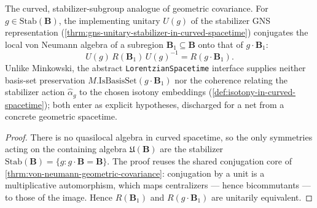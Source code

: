\begin{theorem}
    \label{thrm:von-neumann-geometric-covariance-in-curved-spacetime}
    \leanok
    The curved, stabilizer-subgroup analogue of geometric covariance. For $g \in \mathrm{Stab}(\mathbf{B})$, the implementing unitary $U(g)$ of the stabilizer GNS representation (\ref{thrm:gns-unitary-stabilizer-in-curved-spacetime}) conjugates the local von Neumann algebra of a subregion $\mathbf{B}_1 \subseteq \mathbf{B}$ onto that of $g \cdot \mathbf{B}_1$:
    \[ U(g)\, R(\mathbf{B}_1)\, U(g)^{-1} = R(g \cdot \mathbf{B}_1). \]
    Unlike Minkowski, the abstract \texttt{LorentzianSpacetime} interface supplies neither basis-set preservation $M.\mathrm{IsBasisSet}(g \cdot \mathbf{B}_1)$ nor the coherence relating the stabilizer action $\hat\alpha_g$ to the chosen isotony embeddings (\ref{def:isotony-in-curved-spacetime}); both enter as explicit hypotheses, discharged for a net from a concrete geometric spacetime.
\end{theorem}
\begin{proof}
    \leanok
    There is no quasilocal algebra in curved spacetime, so the only symmetries acting on the containing algebra $\mathfrak{U}(\mathbf{B})$ are the stabilizer $\mathrm{Stab}(\mathbf{B}) = \{g : g \cdot \mathbf{B} = \mathbf{B}\}$. The proof reuses the shared conjugation core of \ref{thrm:von-neumann-geometric-covariance}: conjugation by a unit is a multiplicative automorphism, which maps centralizers --- hence bicommutants --- to those of the image. Hence $R(\mathbf{B}_1)$ and $R(g \cdot \mathbf{B}_1)$ are unitarily equivalent.
\end{proof}

